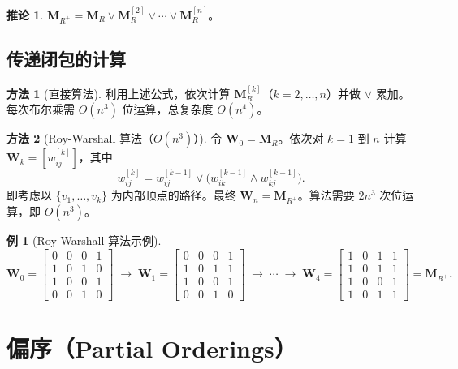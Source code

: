 \documentclass[UTF8,11pt,a4paper]{ctexbook}   %
\theoremstyle{definition}
\newtheorem{example}{例}[section]
\newtheorem{method}{方法}[section]
\newtheorem{corollary}{推论}[section]
\begin{document}
\begin{corollary}
$\mathbf{M}_{R^+} = \mathbf{M}_R \lor \mathbf{M}_R^{[2]} \lor \cdots \lor \mathbf{M}_R^{[n]}$。
\end{corollary}

\subsection{传递闭包的计算}

\begin{method}[直接算法]
利用上述公式，依次计算 $\mathbf{M}_R^{[k]}$（$k=2,\dots,n$）并做 $\lor$ 累加。每次布尔乘需 $O(n^3)$ 位运算，总复杂度 $O(n^4)$。
\end{method}

\begin{method}[Roy-Warshall 算法（$O(n^3)$）]
令 $\mathbf{W}_0 = \mathbf{M}_R$。依次对 $k=1$ 到 $n$ 计算 $\mathbf{W}_k = [w_{ij}^{[k]}]$，其中
\[
w_{ij}^{[k]} = w_{ij}^{[k-1]} \lor \bigl(w_{ik}^{[k-1]} \land w_{kj}^{[k-1]}\bigr).
\]
即考虑以 $\{v_1,\dots,v_k\}$ 为内部顶点的路径。最终 $\mathbf{W}_n = \mathbf{M}_{R^+}$。算法需要 $2n^3$ 次位运算，即 $O(n^3)$。
\end{method}

\begin{example}[Roy-Warshall 算法示例]
\[
\mathbf{W}_0 = \begin{bmatrix}
0 & 0 & 0 & 1\\
1 & 0 & 1 & 0\\
1 & 0 & 0 & 1\\
0 & 0 & 1 & 0
\end{bmatrix}
\;\longrightarrow\;
\mathbf{W}_1 = \begin{bmatrix}
0 & 0 & 0 & 1\\
1 & 0 & 1 & 1\\
1 & 0 & 0 & 1\\
0 & 0 & 1 & 0
\end{bmatrix}
\;\longrightarrow\;
\cdots
\;\longrightarrow\;
\mathbf{W}_4 = \begin{bmatrix}
1 & 0 & 1 & 1\\
1 & 0 & 1 & 1\\
1 & 0 & 0 & 1\\
1 & 0 & 1 & 1
\end{bmatrix}
= \mathbf{M}_{R^+}.
\]
\end{example}

\section{偏序（Partial Orderings）}
\end{document}
